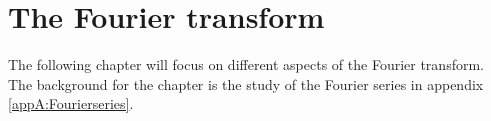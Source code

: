 \chapter{The Fourier transform} \label{ch6}
The following chapter will focus on different aspects of the Fourier transform. The background for the chapter is the study of the Fourier series in appendix \ref{appA:Fourierseries}.







